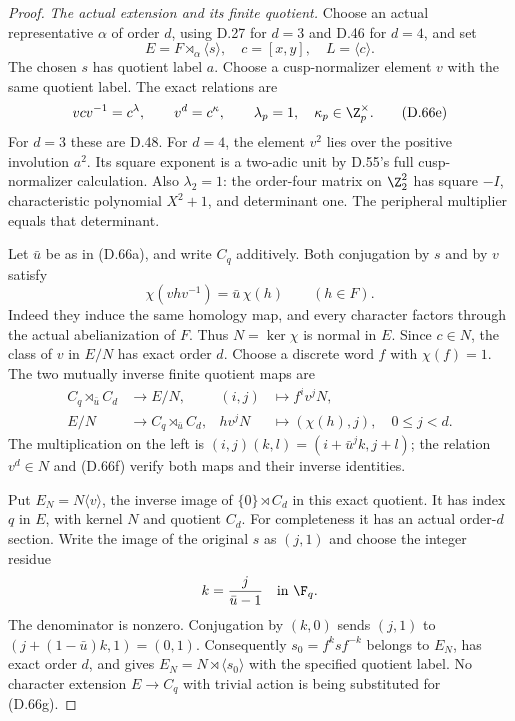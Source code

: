 \begin{proof}
\emph{The actual extension and its finite quotient.}
Choose an actual representative $\alpha$ of order $d$,
using D.27 for $d=3$ and D.46 for $d=4$, and set
\[
 E=F\rtimes_\alpha\langle s\rangle,\quad c=[x,y],\quad
 L=\langle c\rangle .
\]
The chosen $s$ has quotient label $a$. Choose a cusp-normalizer
element $v$ with the same quotient label. The exact relations are
\[
 vcv^{-1}=c^\lambda,\qquad v^d=c^\kappa,\qquad
             \lambda_p=1,\quad \kappa_p\in\Z_p^\times.       \tag{D.66e}
\]
For $d=3$ these are D.48. For $d=4$, the element $v^2$
lies over the positive involution $a^2$. Its square exponent
is a two-adic unit by D.55's full cusp-normalizer calculation.
Also $\lambda_2=1$: the order-four matrix on $\Z_2^2$ has
square $-I$, characteristic polynomial $X^2+1$, and determinant
one. The peripheral multiplier equals that determinant.

Let $\bar u$ be as in (D.66a), and write $C_q$ additively.
Both conjugation by $s$ and by $v$ satisfy
\[
             \chi(vhv^{-1})=\bar u\,\chi(h)
                         \qquad(h\in F).                    \tag{D.66f}
\]
Indeed they induce the same homology map, and every character
factors through the actual abelianization of $F$.
Thus $N=\ker\chi$ is normal in $E$. Since $c\in N$,
the class of $v$ in $E/N$ has exact order $d$.
Choose a discrete word $f$ with $\chi(f)=1$. The two mutually
inverse finite quotient maps are
\[
 \begin{aligned}
 C_q\rtimes_{\bar u} C_d&\longrightarrow E/N,
             &(i,j)&\longmapsto f^i v^jN,\\
 E/N&\longrightarrow C_q\rtimes_{\bar u} C_d,
             &hv^jN&\longmapsto(\chi(h),j),
                    \quad 0\leq j<d.
 \end{aligned}                                               \tag{D.66g}
\]
The multiplication on the left is
$(i,j)(k,l)=(i+\bar u^j k,j+l)$; the relation $v^d\in N$
and (D.66f) verify both maps and their inverse identities.

Put $E_N=N\langle v\rangle$, the inverse image of
$\{0\}\rtimes C_d$ in this exact quotient. It has index
$q$ in $E$, with kernel $N$ and quotient $C_d$.
For completeness it has an actual order-$d$ section.
Write the image of the original $s$ as $(j,1)$ and choose
the integer residue
\[
                    k=\frac{j}{\bar u-1}\quad\text{in }\F_q.
\]
The denominator is nonzero. Conjugation by $(k,0)$ sends
$(j,1)$ to $(j+(1-\bar u)k,1)=(0,1)$. Consequently
$s_0=f^k s f^{-k}$ belongs to $E_N$, has exact order $d$,
and gives $E_N=N\rtimes\langle s_0\rangle$ with the
specified quotient label. No character extension
$E\to C_q$ with trivial action is being substituted for
(D.66g).


\end{proof}
